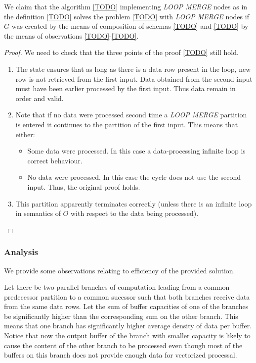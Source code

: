 \begin{claim}
  We claim that the algorithm \ref{TODO} implementing \emph{LOOP MERGE} nodes as in the definition \ref{TODO} solves the problem \ref{TODO} with \emph{LOOP MERGE} nodes if $G$ was created by the means of composition of schemas \ref{TODO} and \ref{TODO} by the means of observations \ref{TODO}-\ref{TODO}.
  \begin{proof}
    We need to check that the three points of the proof \ref{TODO} still hold.
    \begin{enumerate}
      \item The state ensures that as long as there is a data row present in the loop, new row is not retrieved from the first input. Data obtained from the second input must have been earlier processed by the first input. Thus data remain in order and valid.
      \item Note that if no data were processed second time a \emph{LOOP MERGE} partition is entered it continues to the partition of the first input. This means that either:
       \begin{itemize}
         \item Some data were processed. In this case a data-processing infinite loop is correct behaviour.
         \item No data were processed. In this case the cycle does not use the second input. Thus, the original proof holds.
       \end{itemize}
     \item This partition apparently terminates correctly (unless there is an infinite loop in semantics of $O$ with respect to the data being processed).
    \end{enumerate}
  \end{proof}
\end{claim}


\subsubsection{Analysis}
We provide some observations relating to efficiency of the provided solution.

\begin{observation}
  Let there be two parallel branches of computation leading from a common predecessor partition to a common sucessor such that both branches receive data from the same data rows. Let the sum of buffer capacities of one of the branches be significantly higher than the corresponding sum on the other branch. This means that one branch has significantly higher average density of data per buffer. Notice that now the output buffer of the branch with smaller capacity is likely to cause the content of the other branch to be processed even though most of the buffers on this branch does not provide enough data for vectorized processal.
\end{observation}

